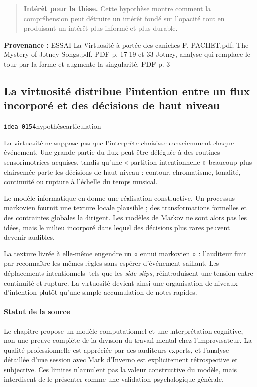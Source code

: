 \documentclass[10pt,a4paper]{article}
\begin{document}
\begin{quote}
\textbf{Intérêt pour la thèse.} Cette hypothèse montre comment la compréhension peut détruire un intérêt fondé sur l'opacité tout en produisant un intérêt plus informé et plus durable.
\end{quote}
{\footnotesize\color{metadata}\textbf{Provenance :} ESSAI-La Virtuosité à portée des caniches-F. PACHET.pdf; The Mystery of Jotney Songs.pdf. PDF p. 17-19 et 33 Jotney, analyse qui remplace le tour par la forme et augmente la singularité, PDF p. 3\par}

\subsection{La virtuosité distribue l'intention entre un flux incorporé et des décisions de haut niveau}
{\small\color{metadata} \texttt{idea\_0154}\quad\textbullet\quad hypothèse\quad\textbullet\quad articulation\par}

La virtuosité ne suppose pas que l'interprète choisisse consciemment chaque événement. Une grande partie du flux peut être déléguée à des routines sensorimotrices acquises, tandis qu'une « partition intentionnelle » beaucoup plus clairsemée porte les décisions de haut niveau : contour, chromatisme, tonalité, continuité ou rupture à l'échelle du temps musical.

Le modèle informatique en donne une réalisation constructive. Un processus markovien fournit une texture locale plausible ; des transformations formelles et des contraintes globales la dirigent. Les modèles de Markov ne sont alors pas les idées, mais le milieu incorporé dans lequel des décisions plus rares peuvent devenir audibles.

La texture livrée à elle-même engendre un « ennui markovien » : l'auditeur finit par reconnaître les mêmes règles sans espérer d'événement saillant. Les déplacements intentionnels, tels que les \emph{side-slips}, réintroduisent une tension entre continuité et rupture. La virtuosité devient ainsi une organisation de niveaux d'intention plutôt qu'une simple accumulation de notes rapides.

\paragraph{Statut de la source}
Le chapitre propose un modèle computationnel et une interprétation cognitive, non une preuve complète de la division du travail mental chez l'improvisateur. La qualité professionnelle est appréciée par des auditeurs experts, et l'analyse détaillée d'une session avec Mark d'Inverno est explicitement rétrospective et subjective. Ces limites n'annulent pas la valeur constructive du modèle, mais interdisent de le présenter comme une validation psychologique générale.
\end{document}
